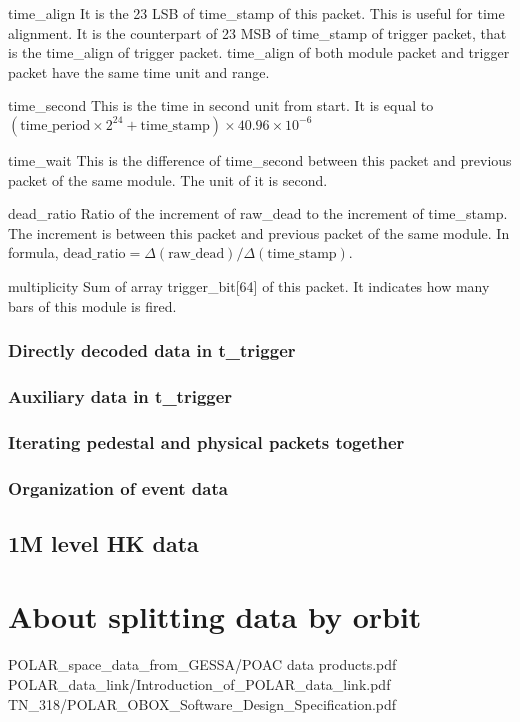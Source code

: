 \documentclass[a4paper, 12pt, onecolumn]{article}
\begin{document}
\begin{asparadesc}
\item[time\_align] It is the 23 LSB of time\_stamp of this packet. This is useful for time alignment. It is the counterpart of 23 MSB of time\_stamp of trigger packet,
  that is the time\_align of trigger packet. time\_align of both module packet and trigger packet have the same time unit and range.
\item[time\_second] This is the time in second unit from start. It is equal to $(\textrm{time\_period}\times 2^{24} + \textrm{time\_stamp})\times 40.96 \times 10^{-6}$
\item[time\_wait] This is the difference of time\_second between this packet and previous packet of the same module. The unit of it is second.
\item[dead\_ratio] Ratio of the increment of raw\_dead to the increment of time\_stamp. The increment is between this packet and previous packet of the same module.
  In formula, $\textrm{dead\_ratio} = \Delta(\textrm{raw\_dead}) / \Delta(\textrm{time\_stamp})$.
\item[multiplicity] Sum of array trigger\_bit[64] of this packet. It indicates how many bars of this module is fired.
\end{asparadesc}

\subsubsection{Directly decoded data in t\_trigger}

\subsubsection{Auxiliary data in t\_trigger}

\subsubsection{Iterating pedestal and physical packets together}

\subsubsection{Organization of event data}

\subsection{1M level HK data}

\section{About splitting data by orbit}
\begin{thebibliography}{9}
 POLAR\_space\_data\_from\_GESSA/POAC data products.pdf
 POLAR\_data\_link/Introduction\_of\_POLAR\_data\_link.pdf
 TN\_318/POLAR\_OBOX\_Software\_Design\_Specification.pdf
\end{thebibliography}
\end{document}
